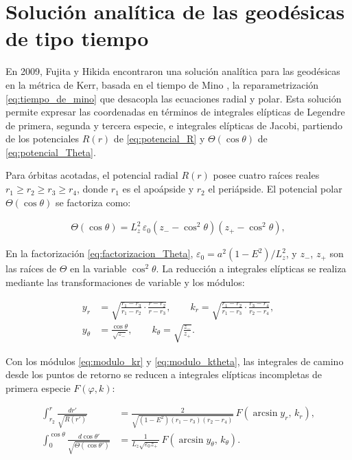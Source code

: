 \section{Solución analítica de las geodésicas de tipo tiempo}

En 2009, Fujita y Hikida \cite{fujita2009analytical} encontraron una solución analítica para las geodésicas en la métrica de Kerr, basada en el tiempo de Mino \cite{mino2003perturbative}, la reparametrización \eqref{eq:tiempo_de_mino} que desacopla las ecuaciones radial y polar. Esta solución permite expresar las coordenadas en términos de integrales elípticas de Legendre de primera, segunda y tercera especie, e integrales elípticas de Jacobi, partiendo de los potenciales $R(r)$ de \eqref{eq:potencial_R} y $\Theta(\cos\theta)$ de \eqref{eq:potencial_Theta}.

Para órbitas acotadas, el potencial radial $R(r)$ posee cuatro raíces reales $r_1 \geq r_2 \geq r_3 \geq r_4$, donde $r_1$ es el apoápside y $r_2$ el periápside. El potencial polar $\Theta(\cos\theta)$ se factoriza como:

\begin{align}
    \Theta(\cos\theta) = L_z^2\,\varepsilon_0\left(z_- - \cos^2\theta\right)\left(z_+ - \cos^2\theta\right), \label{eq:factorizacion_Theta}
\end{align}

En la factorización \eqref{eq:factorizacion_Theta}, $\varepsilon_0 = a^2(1-E^2)/L_z^2$, y $z_-$, $z_+$ son las raíces de $\Theta$ en la variable $\cos^2\theta$. La reducción a integrales elípticas se realiza mediante las transformaciones de variable y los módulos:

\begin{align}
    y_r &= \sqrt{\frac{r_1 - r_3}{r_1 - r_2}\cdot\frac{r - r_2}{r - r_3}}, \qquad
    k_r = \sqrt{\frac{r_1 - r_2}{r_1 - r_3}\cdot\frac{r_3 - r_4}{r_2 - r_4}}, \label{eq:modulo_kr} \\
    y_\theta &= \frac{\cos\theta}{\sqrt{z_-}}, \qquad
    k_\theta = \sqrt{\frac{z_-}{z_+}}. \label{eq:modulo_ktheta}
\end{align}

Con los módulos \eqref{eq:modulo_kr} y \eqref{eq:modulo_ktheta}, las integrales de camino desde los puntos de retorno se reducen a integrales elípticas incompletas de primera especie $F(\varphi, k)$:

\begin{align}
    \int_{r_2}^{r} \frac{dr'}{\sqrt{R(r')}} &= \frac{2}{\sqrt{(1-E^2)(r_1-r_3)(r_2-r_4)}}\,F\!\left(\arcsin y_r,\, k_r\right), \label{eq:integral_r} \\
    \int_{0}^{\cos\theta} \frac{d\cos\theta'}{\sqrt{\Theta(\cos\theta')}} &= \frac{1}{L_z\sqrt{\varepsilon_0 z_+}}\,F\!\left(\arcsin y_\theta,\, k_\theta\right). \label{eq:integral_theta}
\end{align}

